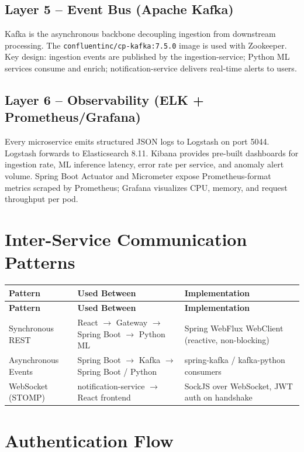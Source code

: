 \documentclass[12pt,a4paper]{report}
\begin{document}
\subsection{Layer 5 -- Event Bus (Apache Kafka)}
Kafka is the asynchronous backbone decoupling ingestion from downstream processing. The \texttt{confluentinc/cp-kafka:7.5.0} image is used with Zookeeper. Key design: ingestion events are published by the ingestion-service; Python ML services consume and enrich; notification-service delivers real-time alerts to users.

\subsection{Layer 6 -- Observability (ELK + Prometheus/Grafana)}
Every microservice emits structured JSON logs to Logstash on port 5044. Logstash forwards to Elasticsearch 8.11. Kibana provides pre-built dashboards for ingestion rate, ML inference latency, error rate per service, and anomaly alert volume. Spring Boot Actuator and Micrometer expose Prometheus-format metrics scraped by Prometheus; Grafana visualizes CPU, memory, and request throughput per pod.

\section{Inter-Service Communication Patterns}

\begin{longtable}{p{3cm} p{5cm} p{6cm}}
\toprule
\textbf{Pattern} & \textbf{Used Between} & \textbf{Implementation} \\
\midrule
\endfirsthead
\toprule
\textbf{Pattern} & \textbf{Used Between} & \textbf{Implementation} \\
\midrule
\endhead
\bottomrule
\endlastfoot
Synchronous REST & React $\rightarrow$ Gateway $\rightarrow$ Spring Boot $\rightarrow$ Python ML & Spring WebFlux WebClient (reactive, non-blocking) \\[3pt]
Asynchronous Events & Spring Boot $\rightarrow$ Kafka $\rightarrow$ Spring Boot / Python & spring-kafka / kafka-python consumers \\[3pt]
WebSocket (STOMP) & notification-service $\rightarrow$ React frontend & SockJS over WebSocket, JWT auth on handshake \\[3pt]
\end{longtable}

\section{Authentication Flow}
\end{document}
